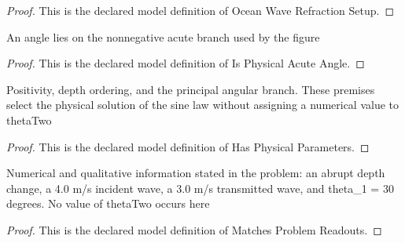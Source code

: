 \begin{proof}
  This is the declared model definition of Ocean Wave Refraction Setup.
\end{proof}
\begin{definition}
  \label{def:physics:phyx-mini-0174:phyxminiproblems-problemphyxmini0174-isphysicalacuteangle}
  An angle lies on the nonnegative acute branch used by the figure
\end{definition}
\begin{proof}
  This is the declared model definition of Is Physical Acute Angle.
\end{proof}
\begin{definition}
  \label{def:physics:phyx-mini-0174:phyxminiproblems-problemphyxmini0174-hasphysicalparameters}
  Positivity, depth ordering, and the principal angular branch. These premises select the physical solution of the sine law without assigning a numerical value to thetaTwo
\end{definition}
\begin{proof}
  This is the declared model definition of Has Physical Parameters.
\end{proof}
\begin{definition}
  \label{def:physics:phyx-mini-0174:phyxminiproblems-problemphyxmini0174-matchesproblemreadouts}
  Numerical and qualitative information stated in the problem: an abrupt depth change, a 4.0 m/s incident wave, a 3.0 m/s transmitted wave, and theta\_1 = 30 degrees. No value of thetaTwo occurs here
\end{definition}
\begin{proof}
  This is the declared model definition of Matches Problem Readouts.
\end{proof}

